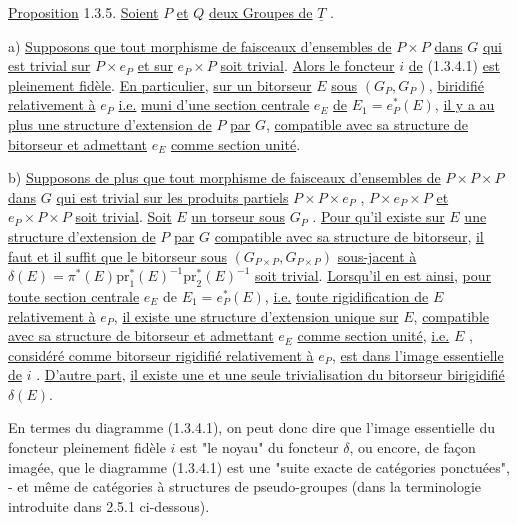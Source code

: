 \underline{Proposition} 1.3.5. \underline{Soient} $P$ \underline{et} $Q$ \underline{deux Groupes de} $\underline{T}$ .

a)  \underline{Supposons que tout morphisme de faisceaux d'ensembles de} $P\times P$ \underline{dans} $G$ \underline{qui est trivial sur} $P\times e_P$ \underline{et sur} $e_P\times P$ \underline{soit trivial}. \underline{Alors le foncteur} $i$ \underline{de} (1.3.4.1) \underline{est pleinement fidèle}. \underline{En particulier}, \underline{sur un bitorseur} $E$ \underline{sous} $(G_P,G_P)$, \underline{biridifié relativement à} $e_P$ \underline{i.e.} \underline{muni d'une section centrale} $e_E$ \underline{de} $E_1 = e_P^*(E)$, \underline{il y a au plus une structure d'extension de} $P$ \underline{par} $G$, \underline{compatible avec sa structure de bitorseur et admettant} $e_E$ \underline{comme section unité}.

b)  \underline{Supposons de plus que tout morphisme de faisceaux d'ensembles de} $P\times P\times P$ \underline{dans} $G$ \underline{qui est trivial sur les produits partiels} $P\times P\times e_P$ , $P\times e_P\times P$ \underline{et} $e_P\times P\times P$ \underline{soit trivial}. \underline{Soit} $E$ \underline{un torseur sous} $G_P$ . \underline{Pour qu'il existe sur} $E$ \underline{une structure d'extension de} $P$ \underline{par} $G$ \underline{compatible avec sa structure de bitorseur}, \underline{il faut et il suffit que le bitorseur sous} $(G_{P\times P},G_{P\times P})$ \underline{sous-jacent à} $\delta(E) = \pi^*(E)\mathrm{pr}_1^*(E)^{-1}\mathrm{pr}_2^*(E)^{-1}$ \underline{soit trivial}. \underline{Lorsqu'il en est ainsi}, \underline{pour toute section centrale} $e_E$ de $E_1 = e_P^*(E)$, \underline{i.e.} \underline{toute rigidification de} $E$ \underline{relativement à} $e_P$, \underline{il existe une structure d'extension unique sur} $E$, \underline{compatible avec sa structure de bitorseur et admettant} $e_E$ \underline{comme section unité}, \underline{i.e.} $E$ , \underline{considéré comme bitorseur rigidifié relativement à} $e_P$, \underline{est dans l'image essentielle de} $i$ . \underline{D'autre part}, \underline{il existe une et une seule trivialisation du bitorseur birigidifié} $\delta(E)$.



En termes du diagramme (1.3.4.1), on peut donc dire que l'image essentielle du foncteur pleinement fidèle $i$ est "le noyau" du foncteur $\delta$, ou encore, de façon imagée, que le diagramme (1.3.4.1) est une "suite exacte de catégories ponctuées", - et même de catégories à structures de pseudo-groupes (dans la terminologie introduite dans 2.5.1 ci-dessous).


